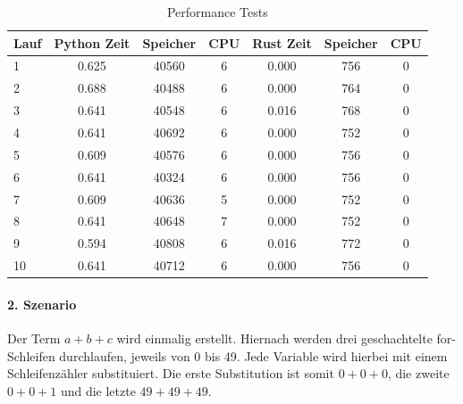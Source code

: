 \documentclass[11pt,a4paper, ngerman]{article}
\begin{document}
\begin{table}[ht!]
    \caption{Performance Tests}
    \centering
    \begin{tabular}{|l|c|c|c|c|c|c|}
        \hline
        \textbf{Lauf} & \textbf{Python Zeit} & \textbf{Speicher} & \textbf{CPU} & \textbf{Rust Zeit} & \textbf{Speicher} & \textbf{CPU} \\
        \hline
        1 & 0.625 & 40560 & 6 & 0.000 & 756 & 0 \\
        \hline
        2 & 0.688 & 40488 & 6 & 0.000 & 764 & 0 \\
        \hline
        3 & 0.641 & 40548 & 6 & 0.016 & 768 & 0 \\
        \hline
        4 & 0.641 & 40692 & 6 & 0.000 & 752 & 0 \\
        \hline
        5 & 0.609 & 40576 & 6 & 0.000 & 756 & 0 \\
        \hline
        6 & 0.641 & 40324 & 6 & 0.000 & 756 & 0 \\
        \hline
        7 & 0.609 & 40636 & 5 & 0.000 & 752 & 0 \\
        \hline
        8 & 0.641 & 40648 & 7 & 0.000 & 752 & 0 \\
        \hline
        9 & 0.594 & 40808 & 6 & 0.016 & 772 & 0 \\
        \hline
        10 & 0.641 & 40712 & 6 & 0.000 & 756 & 0 \\
        \hline
    \end{tabular}
\end{table}

\paragraph{2. Szenario} Der Term $a+b+c$ wird einmalig erstellt. Hiernach werden drei geschachtelte for-Schleifen durchlaufen, jeweils von 0 bis 49. Jede Variable wird hierbei mit einem Schleifenzähler substituiert. Die erste Substitution ist somit $0+0+0$, die zweite $0+0+1$ und die letzte $49+49+49$.
\end{document}
